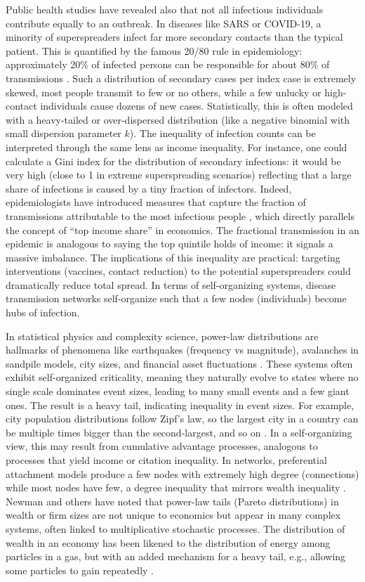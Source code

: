 \documentclass[11pt]{article}
\begin{document}
Public health studies have revealed also that not all infectious individuals contribute equally to an outbreak. In diseases like SARS or COVID-19, a minority of superspreaders infect far more secondary contacts than the typical patient. This is quantified by the famous 20/80 rule in epidemiology: approximately 20\% of infected persons can be responsible for about 80\% of transmissions \citep{cheng2025power}. Such a distribution of secondary cases per index case is extremely skewed, most people transmit to few or no others, while a few unlucky or high-contact individuals cause dozens of new cases. Statistically, this is often modeled with a heavy-tailed or over-dispersed distribution (like a negative binomial with small dispersion parameter $k$). The inequality of infection counts can be interpreted through the same lens as income inequality. For instance, one could calculate a Gini index for the distribution of secondary infections: it would be very high (close to 1 in extreme superspreading scenarios) reflecting that a large share of infections is caused by a tiny fraction of infectors. Indeed, epidemiologists have introduced measures that capture the fraction of transmissions attributable to the most infectious people \citep{peter2022fractional}, which directly parallels the concept of “top income share” in economics. The fractional transmission in an epidemic is analogous to saying the top quintile holds of income: it signals a massive imbalance. The implications of this inequality are practical: targeting interventions (vaccines, contact reduction) to the potential superspreaders could dramatically reduce total spread. In terms of self-organizing systems, disease transmission networks self-organize such that a few nodes (individuals) become hubs of infection. 

In statistical physics and complexity science, power-law distributions are hallmarks of phenomena like earthquakes (frequency vs magnitude), avalanches in sandpile models, city sizes, and financial asset fluctuations \citep{sornette2009seismicity, boccara2010power}. These systems often exhibit self-organized criticality, meaning they naturally evolve to states where no single scale dominates event sizes, leading to many small events and a few giant ones. The result is a heavy tail, indicating inequality in event sizes. For example, city population distributions follow Zipf’s law, so the largest city in a country can be multiple times bigger than the second-largest, and so on \citep{arshad2018zipf}. In a self-organizing view, this may result from cumulative advantage processes, analogous to processes that yield income or citation inequality. In networks, preferential attachment models produce a few nodes with extremely high degree (connections) while most nodes have few, a degree inequality that mirrors wealth inequality \citep{jeong2003measuring}. Newman and others have noted that power-law tails (Pareto distributions) in wealth or firm sizes are not unique to economics but appear in many complex systems, often linked to multiplicative stochastic processes. The distribution of wealth in an economy has been likened to the distribution of energy among particles in a gas, but with an added mechanism for a heavy tail, e.g., allowing some particles to gain repeatedly \citep{modanese2016common}. 
\end{document}
